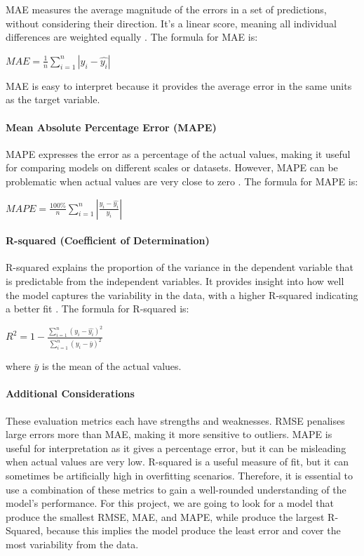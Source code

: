 \documentclass[11pt,a4paper,]{article}
\begin{document}
MAE measures the average magnitude of the errors in a set of predictions, without considering their direction. It's a linear score, meaning all individual differences are weighted equally \autocite{ISLR,Hastie09}. The formula for MAE is:

\(MAE = \frac{1}{n} {\sum^n_{i=1}|y_i-\hat{y_i}|}\)

MAE is easy to interpret because it provides the average error in the same units as the target variable.

\paragraph{Mean Absolute Percentage Error (MAPE)}\label{mean-absolute-percentage-error-mape}

MAPE expresses the error as a percentage of the actual values, making it useful for comparing models on different scales or datasets. However, MAPE can be problematic when actual values are very close to zero \autocite{ISLR,Hastie09}. The formula for MAPE is:

\(MAPE = \frac{100\%}{n} {\sum^n_{i=1}|\frac{y_i-\hat{y_i}}{y_i}|}\)

\paragraph{R-squared (Coefficient of Determination)}\label{r-squared-coefficient-of-determination}

R-squared explains the proportion of the variance in the dependent variable that is predictable from the independent variables. It provides insight into how well the model captures the variability in the data, with a higher R-squared indicating a better fit \autocite{ISLR,Hastie09}. The formula for R-squared is:

\(R^2 = 1-\frac{\sum^n_{i=1}(y_i-\hat{y_i})^2}{\sum^n_{i=1}(y_i-\bar{y})^2}\)

where \(\bar{y}\) is the mean of the actual values.

\paragraph{Additional Considerations}\label{additional-considerations}

These evaluation metrics each have strengths and weaknesses. RMSE penalises large errors more than MAE, making it more sensitive to outliers. MAPE is useful for interpretation as it gives a percentage error, but it can be misleading when actual values are very low. R-squared is a useful measure of fit, but it can sometimes be artificially high in overfitting scenarios. Therefore, it is essential to use a combination of these metrics to gain a well-rounded understanding of the model's performance. For this project, we are going to look for a model that produce the smallest RMSE, MAE, and MAPE, while produce the largest R-Squared, because this implies the model produce the least error and cover the most variability from the data.
\end{document}
